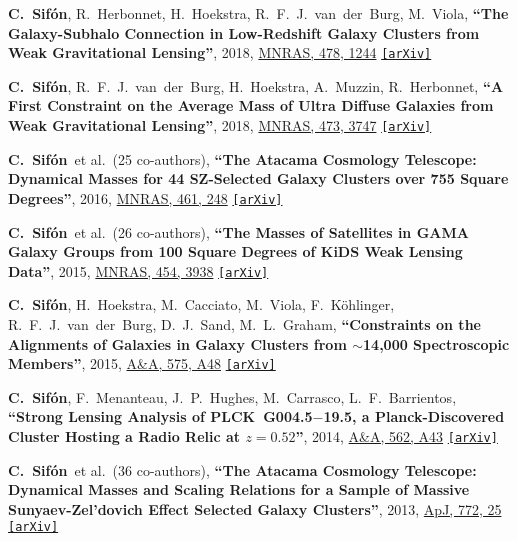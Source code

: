 \documentclass{article}
\def\aap{A\&A}
\def\apj{ApJ}
\def\mnras{MNRAS}
\newcommand{\myself}{\textbf{\color{red} C.~Sif\'on}}
\newcommand{\etal}[1]{et al.\ (#1 co-authors),}
\newcommand{\paper}[1]{\textbf{``#1''}}
\newcommand{\arxiv}[1]
    {\href{https://arxiv.org/abs/#1}{\texttt{\color{magenta}[arXiv]}}}
\begin{document}
\begin{etaremune}

\item
\myself, R.~Herbonnet, H.~Hoekstra, R.~F.~J.~van~der~Burg, M.~Viola,
\paper{The Galaxy-Subhalo Connection in Low-Redshift Galaxy Clusters from Weak Gravitational Lensing},
2018, \href{http://adsabs.harvard.edu/abs/2018MNRAS.478.1244S}{\mnras, 478, 1244}
\arxiv{1706.06125}

\item
\myself, R.~F.~J.~van~der~Burg, H.~Hoekstra, A.~Muzzin, R.~Herbonnet,
\paper{A First Constraint on the Average Mass of Ultra Diffuse Galaxies from Weak Gravitational Lensing},
2018, \href{http://adsabs.harvard.edu/abs/2018MNRAS.473.3747S}{\mnras, 473, 3747}
\arxiv{1704.07847}

\item 
\myself\ \etal{25}
\paper{The Atacama Cosmology Telescope: Dynamical Masses for 44 SZ-Selected Galaxy Clusters over 755 Square Degrees},
2016, \href{http://adsabs.harvard.edu/abs/2016MNRAS.461..248S}{\mnras, 461, 248}
\arxiv{1512.00910}

\item
\myself\ \etal{26}
\paper{The Masses of Satellites in GAMA Galaxy Groups from 100 Square Degrees of KiDS Weak Lensing Data},
2015, \href{https://adsabs.harvard.edu/abs/2015MNRAS.454.3938S}{\mnras, 454, 3938}
\arxiv{1507.00737}

\item
\myself, H.~Hoekstra, M.~Cacciato, M.~Viola, F.~K\"ohlinger, R.~F.~J.~van~der~Burg, D.~J.~Sand, M.~L.~Graham,
\paper{Constraints on the Alignments of Galaxies in Galaxy Clusters from $\sim$14,000 Spectroscopic Members},
2015, \href{https://adsabs.harvard.edu/abs/2015A&A...575A..48S}{\aap, 575, A48}
\arxiv{1406.5196}

\item
\myself, F.~Menanteau, J.~P.~Hughes, M.~Carrasco, L.~F.~Barrientos,
\paper{Strong Lensing Analysis of PLCK~G004.5$-$19.5, a Planck-Discovered Cluster Hosting a Radio Relic at $z=0.52$},
2014, \href{https://adsabs.harvard.edu/abs/2014A&A...562A..43S}{\aap, 562, A43}
\arxiv{1304.0686}

\item 
\myself\ \etal{36}
\paper{The Atacama Cosmology Telescope: Dynamical Masses and Scaling Relations for a Sample of Massive Sunyaev-Zel'dovich Effect Selected Galaxy Clusters}, 
2013, \href{https://adsabs.harvard.edu/abs/2013ApJ...772...25S}{\apj, 772, 25}
\arxiv{1201.0991}

\end{etaremune}
\end{document}
